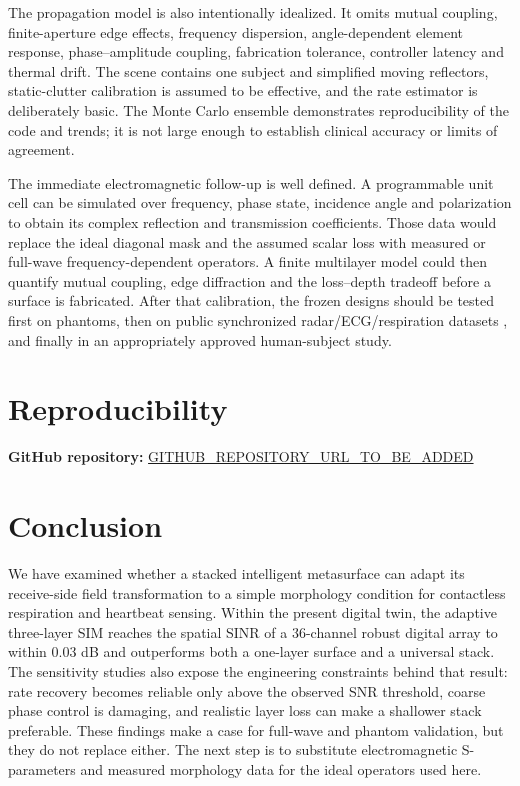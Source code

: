 \documentclass[pdflatex,sn-nature]{sn-jnl}
\begin{document}
The propagation model is also intentionally idealized. It omits mutual coupling,
finite-aperture edge effects, frequency dispersion, angle-dependent element response,
phase--amplitude coupling, fabrication tolerance, controller latency and thermal
drift. The scene contains one subject and simplified moving reflectors, static-clutter
calibration is assumed to be effective, and the rate estimator is deliberately basic.
The Monte Carlo ensemble demonstrates reproducibility of the code and trends; it is
not large enough to establish clinical accuracy or limits of agreement.

The immediate electromagnetic follow-up is well defined. A programmable unit cell
can be simulated over frequency, phase state, incidence angle and polarization to
obtain its complex reflection and transmission coefficients. Those data would replace
the ideal diagonal mask and the assumed scalar loss with measured or full-wave
frequency-dependent operators. A finite multilayer model could then quantify mutual
coupling, edge diffraction and the loss--depth tradeoff before a surface is fabricated.
After that calibration, the frozen designs should be tested first on phantoms, then on
public synchronized radar/ECG/respiration datasets \cite{shi2020dataset,
edanami2022dataset}, and finally in an appropriately approved human-subject study.

\section{Reproducibility}
\noindent\textbf{GitHub repository:} \url{GITHUB_REPOSITORY_URL_TO_BE_ADDED}

\section{Conclusion}
We have examined whether a stacked intelligent metasurface can adapt its receive-side
field transformation to a simple morphology condition for contactless respiration and
heartbeat sensing. Within the present digital twin, the adaptive three-layer SIM
reaches the spatial SINR of a 36-channel robust digital array to within 0.03 dB and
outperforms both a one-layer surface and a universal stack. The sensitivity studies
also expose the engineering constraints behind that result: rate recovery becomes
reliable only above the observed SNR threshold, coarse phase control is damaging, and
realistic layer loss can make a shallower stack preferable. These findings make a
case for full-wave and phantom validation, but they do not replace either. The next
step is to substitute electromagnetic S-parameters and measured morphology data for
the ideal operators used here.
\end{document}
